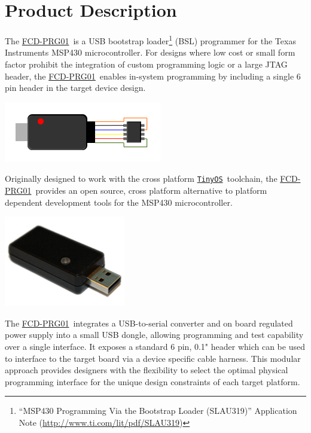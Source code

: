 \documentclass[10pt,letterpaper]{datasheet}
\newcommand{\PIDNOLINK}{FCD\nobreakdash-PRG01}
\newcommand{\PID}{\href{http://www.flyingcampdesign.com/msp430-bsl-programmer.html}{\PIDNOLINK}}
\newcommand{\tos}{\texttt{TinyOS}}
\newcommand{\tosurl}{\href{http://tinyos.net/}{\tos}}
\newcommand{\SLAUNOLINK}{SLAU319}
\newcommand{\SLAUPDFURL}{\href{http://www.ti.com/lit/pdf/SLAU319}{http://www.ti.com/lit/pdf/SLAU319}}
\begin{document}
\section*{Product Description}
\begin{multicols}{2}
  The \PID\ is a USB bootstrap loader\footnote{``MSP430 Programming Via the Bootstrap Loader (\SLAUNOLINK)'' Application Note (\SLAUPDFURL)} (BSL) programmer for the Texas Instruments MSP430 microcontroller.  For designs where low cost or small form factor prohibit the integration of custom programming logic or a large JTAG header, the \PID\ enables in-system programming by including a single 6 pin header in the target device design.

  \begin{center}
    \includegraphics[width=3 in]{fcd-prg01-diag}
  \end{center}

  Originally designed to work with the cross platform \tosurl\ toolchain, the \PID\ provides an open source, cross platform alternative to platform dependent development tools for the MSP430 microcontroller.

  \begin{center}
    \includegraphics[width=2 in]{fcd-prg01}
  \end{center}

  The \PID\ integrates a USB-to-serial converter and on board regulated power supply into a small USB dongle, allowing programming and test capability over a single interface.  It exposes a standard 6 pin, 0.1" header which can be used to interface to the target board via a device specific cable harness.  This modular approach provides designers with the flexibility to select the optimal physical programming interface for the unique design constraints of each target platform.

\end{multicols}
\end{document}
